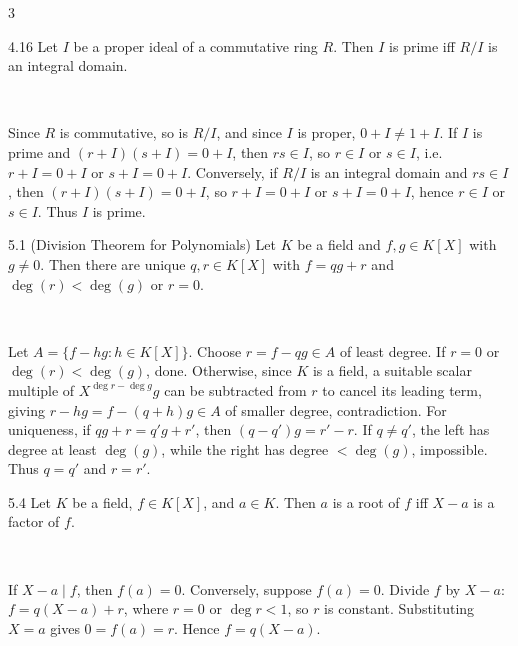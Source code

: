 \documentclass[8pt]{extarticle}
\makeatletter
\renewenvironment{proof}[1][\proofname]{%
  \begin{tcolorbox}[proofpairboxstyle]%
  \pushQED{\qed}%
  \normalfont\itshape #1\@addpunct{.}\ \normalfont\ignorespaces
}{%
  \popQED%
  \end{tcolorbox}%
}
\makeatother
\begin{document}
\begin{multicols*}{3}
        \begin{theorem}{4.16}
            Let \(I\) be a proper ideal of a commutative ring \(R\). Then \(I\) is prime iff \(R/I\) is an integral domain.
        \end{theorem}

        \begin{proof}
            Since \(R\) is commutative, so is \(R/I\), and since \(I\) is proper, \(0+I\ne1+I\). If \(I\) is prime and \((r+I)(s+I)=0+I\), then \(rs\in I\), so \(r\in I\) or \(s\in I\), i.e. \(r+I=0+I\) or \(s+I=0+I\). Conversely, if \(R/I\) is an integral domain and \(rs\in I\), then \((r+I)(s+I)=0+I\), so \(r+I=0+I\) or \(s+I=0+I\), hence \(r\in I\) or \(s\in I\). Thus \(I\) is prime.
        \end{proof}

        \begin{theorem}{5.1}
            (Division Theorem for Polynomials) Let \(K\) be a field and \(f,g\in K[X]\) with \(g\ne0\). Then there are unique \(q,r\in K[X]\) with \(f=qg+r\) and \(\deg(r)<\deg(g)\) or \(r=0\).
        \end{theorem}

        \begin{proof}
            Let \(A=\{f-hg:h\in K[X]\}\). Choose \(r=f-qg\in A\) of least degree. If \(r=0\) or \(\deg(r)<\deg(g)\), done. Otherwise, since \(K\) is a field, a suitable scalar multiple of \(X^{\deg r-\deg g}g\) can be subtracted from \(r\) to cancel its leading term, giving \(r-hg=f-(q+h)g\in A\) of smaller degree, contradiction. For uniqueness, if \(qg+r=q'g+r'\), then \((q-q')g=r'-r\). If \(q\ne q'\), the left has degree at least \(\deg(g)\), while the right has degree \(<\deg(g)\), impossible. Thus \(q=q'\) and \(r=r'\).
        \end{proof}

        \begin{corollary}{5.4}
            Let \(K\) be a field, \(f\in K[X]\), and \(a\in K\). Then \(a\) is a root of \(f\) iff \(X-a\) is a factor of \(f\).
        \end{corollary}

        \begin{proof}
            If \(X-a\mid f\), then \(f(a)=0\). Conversely, suppose \(f(a)=0\). Divide \(f\) by \(X-a\): \(f=q(X-a)+r\), where \(r=0\) or \(\deg r<1\), so \(r\) is constant. Substituting \(X=a\) gives \(0=f(a)=r\). Hence \(f=q(X-a)\).
        \end{proof}


\end{multicols*}
\end{document}
